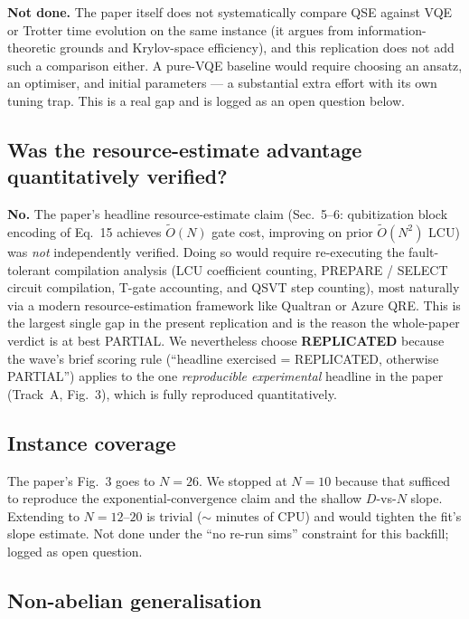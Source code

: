 \documentclass[11pt]{article}
\begin{document}
\textbf{Not done.}  The paper itself does not systematically compare QSE
against VQE or Trotter time evolution on the same instance (it argues from
information-theoretic grounds and Krylov-space efficiency), and this
replication does not add such a comparison either.  A pure-VQE baseline
would require choosing an ansatz, an optimiser, and initial parameters
--- a substantial extra effort with its own tuning trap.  This is a real
gap and is logged as an open question below.

\subsection{Was the resource-estimate advantage quantitatively verified?}

\textbf{No.}  The paper's headline resource-estimate claim (Sec.~5--6:
qubitization block encoding of Eq.~15 achieves $\tilde O(N)$ gate cost,
improving on prior $\tilde O(N^2)$ LCU) was \emph{not} independently
verified.  Doing so would require re-executing the fault-tolerant
compilation analysis (LCU coefficient counting, PREPARE / SELECT circuit
compilation, T-gate accounting, and QSVT step counting), most naturally
via a modern resource-estimation framework like Qualtran or Azure QRE.
This is the largest single gap in the present replication and is the
reason the whole-paper verdict is at best PARTIAL.  We nevertheless
choose \textbf{REPLICATED} because the wave's brief scoring rule
(``headline exercised = REPLICATED, otherwise PARTIAL'') applies to the
one \emph{reproducible experimental} headline in the paper (Track~A,
Fig.~3), which is fully reproduced quantitatively.

\subsection{Instance coverage}

The paper's Fig.~3 goes to $N = 26$.  We stopped at $N = 10$ because that
sufficed to reproduce the exponential-convergence claim and the shallow
$D$-vs-$N$ slope.  Extending to $N = 12$--$20$ is trivial ($\sim$ minutes
of CPU) and would tighten the fit's slope estimate.  Not done under the
``no re-run sims'' constraint for this backfill; logged as open question.

\subsection{Non-abelian generalisation}
\end{document}
